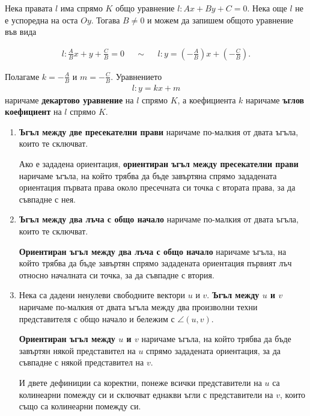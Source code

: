 \documentclass[numbers=endperiod, bibliography=totocnumbered]{scrartcl}
\begin{document}
\begin{definition}
  Нека правата \( l \) има спрямо \( K \) общо уравнение \( l: Ax + By + C = 0 \). Нека още \( l \) не е успоредна на оста \( Oy \). Тогава \( B \neq 0 \) и можем да запишем общото уравнение във вида

  \begin{align*}
    l: \frac A B x + y + \frac C B = 0
    &&\sim&&
    l: y = \left(-\frac A B \right) x + \left(-\frac C B \right).
  \end{align*}

  Полагаме \( k = -\frac A B \) и \( m = -\frac C B \). Уравнението
  \begin{align*}
    l: y = kx + m
  \end{align*}
  наричаме \textbf{декартово уравнение} на \( l \) спрямо \( K \), а коефициента \( k \) наричаме \textbf{ъглов коефициент} на \( l \) спрямо \( K \).
\end{definition}

\begin{definition}
  \mbox{}
  \begin{enumerate}
    \item \textbf{Ъгъл между две пресекателни прави} наричаме по-малкия от двата ъгъла, които те сключват.

    Ако е зададена ориентация, \textbf{ориентиран ъгъл между пресекателни прави} наричаме ъгъла, на който трябва да бъде завъртяна спрямо зададената ориентация първата права около пресечната си точка с втората права, за да съвпадне с нея.

    \item \textbf{Ъгъл между два лъча с общо начало} наричаме по-малкия от двата ъгъла, които те сключват.

    \textbf{Ориентиран ъгъл между два лъча с общо начало} наричаме ъгъла, на който трябва да бъде завъртян спрямо зададената ориентация първият лъч относно началната си точка, за да съвпадне с втория.

    \item Нека са дадени ненулеви свободните вектори \( u \) и \( v \). \textbf{Ъгъл между \( u \) и \( v \)} наричаме по-малкия от двата ъгъла между два произволни техни представителя с общо начало и бележим с \( \angle(u, v) \).

    \textbf{Ориентиран ъгъл между \( u \) и \( v \)} наричаме ъгъла, на който трябва да бъде завъртян някой представител на \( u \) спрямо зададената ориентация, за да съвпадне с някой представител на \( v \).

    И двете дефиниции са коректни, понеже всички представители на \( u \) са колинеарни помежду си и сключват еднакви ъгли с представители на \( v \), които също са колинеарни помежду си.
  \end{enumerate}
\end{definition}
\end{document}
